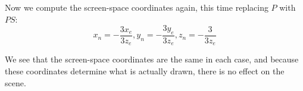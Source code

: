 \documentclass[11pt]{tingpset}
\begin{document}
    Now we compute the screen-space coordinates again, this time replacing $P$ with $PS$:
    \[
      x_n = -\frac{3x_e}{3z_e}, y_n = -\frac{3y_e}{3z_e}, z_n = -\frac{3}{3z_e}
    \]

    We see that the screen-space coordinates are the same in each case, and because these coordinates determine what is actually drawn, there is no effect on the scene.
\end{document}
